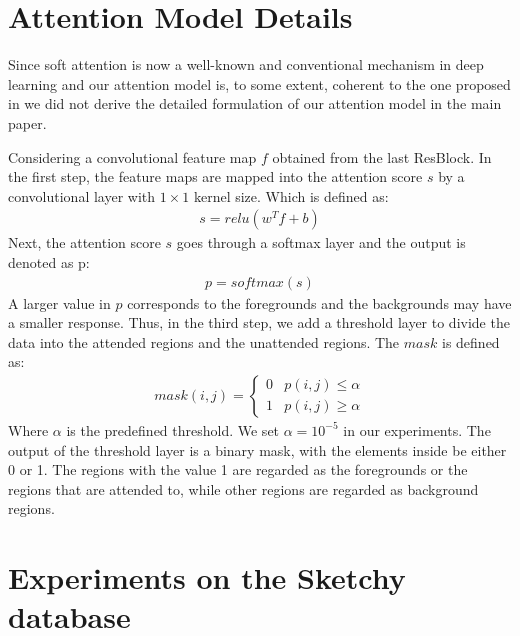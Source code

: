 \documentclass[runningheads]{llncs}
\begin{document}
 \section{Attention Model Details}
 Since soft attention is now a well-known and conventional
mechanism in deep learning and our attention model
is, to some extent, coherent to the one proposed in \cite{SongYSXH17}
we did not derive the detailed formulation of our attention
model in the main paper.

Considering a convolutional feature map $f$ obtained from the last ResBlock. 
In the first step, the feature maps are mapped into the attention score $s$ by a convolutional
layer with $1 \times 1$ kernel size. Which is defined as:
\begin{equation}\label{eq:equiv1}
\begin{split}
s = relu(w^{T}f + b)
\end{split}
\end{equation}
Next, the attention score $s$ goes through a softmax layer and the output is denoted as p:
\begin{equation}\label{eq:equiv2}
\begin{split}
p = softmax(s)
\end{split}
\end{equation}
A larger value in $p$ corresponds to the foregrounds and
the backgrounds may have a smaller response. Thus, in the
third step, we add a threshold layer to divide the data into
the attended regions and the unattended regions. The $mask$ is
defined as:
\begin{equation}\label{eq:equiv3}
\begin{split}
mask(i,j)=
\begin{cases}
0& p(i,j) \leq \alpha \\
1& p(i,j) \ge \alpha 
\end{cases}
\end{split}
\end{equation}
Where $\alpha$ is the predefined threshold. We set $\alpha = 10^{-5}$ in our experiments. The output of the threshold layer is a binary
mask, with the elements inside be either 0 or 1. The regions
with the value 1 are regarded as the foregrounds or the regions
that are attended to, while other regions are regarded as
background regions.	


 \section{Experiments on the Sketchy database}
\end{document}
